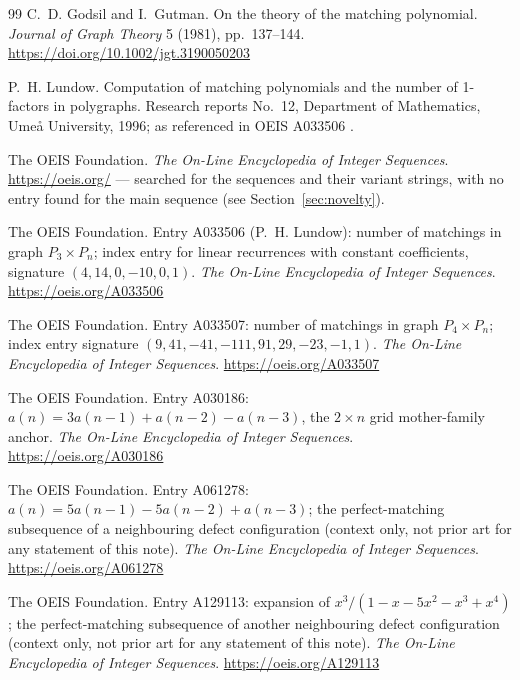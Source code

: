 \documentclass[11pt]{article}
\theoremstyle{definition}
\begin{document}
\begin{thebibliography}{99}
C.~D. Godsil and I.~Gutman.
\newblock On the theory of the matching polynomial.
\newblock \emph{Journal of Graph Theory} 5 (1981), pp.~137--144.
\url{https://doi.org/10.1002/jgt.3190050203}

P.~H. Lundow.
\newblock Computation of matching polynomials and the number of 1-factors in
polygraphs.
\newblock Research reports No.~12, Department of Mathematics, Ume{\aa}
University, 1996; as referenced in OEIS A033506 \cite{oeis-a033506}.

The OEIS Foundation.
\newblock \emph{The On-Line Encyclopedia of Integer Sequences}.
\newblock \url{https://oeis.org/} --- searched for the sequences and their
variant strings, with no entry found for the main sequence (see
Section~\ref{sec:novelty}).

The OEIS Foundation.
\newblock Entry A033506 (P.~H. Lundow): number of matchings in graph
$P_3\times P_n$; index entry for linear recurrences with constant
coefficients, signature $(4,14,0,-10,0,1)$.
\newblock \emph{The On-Line Encyclopedia of Integer Sequences}.
\url{https://oeis.org/A033506}

The OEIS Foundation.
\newblock Entry A033507: number of matchings in graph $P_4\times P_n$; index
entry signature $(9,41,-41,-111,91,29,-23,-1,1)$.
\newblock \emph{The On-Line Encyclopedia of Integer Sequences}.
\url{https://oeis.org/A033507}

The OEIS Foundation.
\newblock Entry A030186: $a(n)=3a(n-1)+a(n-2)-a(n-3)$, the $2\times n$ grid
mother-family anchor.
\newblock \emph{The On-Line Encyclopedia of Integer Sequences}.
\url{https://oeis.org/A030186}

The OEIS Foundation.
\newblock Entry A061278: $a(n)=5a(n-1)-5a(n-2)+a(n-3)$; the perfect-matching
subsequence of a neighbouring defect configuration (context only, not prior
art for any statement of this note).
\newblock \emph{The On-Line Encyclopedia of Integer Sequences}.
\url{https://oeis.org/A061278}

The OEIS Foundation.
\newblock Entry A129113: expansion of
$x^3/(1-x-5x^2-x^3+x^4)$; the perfect-matching subsequence of another
neighbouring defect configuration (context only, not prior art for any
statement of this note).
\newblock \emph{The On-Line Encyclopedia of Integer Sequences}.
\url{https://oeis.org/A129113}
\end{thebibliography}
\end{document}
